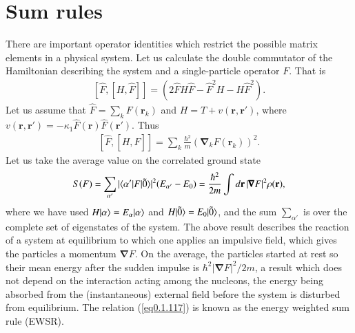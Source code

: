 \section{Sum rules}\label{Sect1.7}
There are important operator identities which restrict the possible matrix elements in a physical system. Let us calculate the double commutator of the Hamiltonian describing the system and a single-particle operator $F$. That is
\begin{align}\label{eq0.1.115}
\left[\hat F,\left[H,\hat F\right]\right]=\left(2\hat FH\hat F-\hat F^2H-H\hat F^2\right).
\end{align}
Let us assume that $\hat F=\sum_k F(\mathbf r_k)$ and $H=T+v(\mathbf r, \mathbf r')$, where $v(\mathbf r,\mathbf r')=-\kappa_1 \hat F(\mathbf r)\hat F(\mathbf r')$. Thus 
\begin{align}\label{eq0.1.116}
\left[\hat F,\left[H,\hat F\right]\right]=\sum_k\frac{\hbar^2}{m}\left(\pmb \nabla_kF(\mathbf r_k)\right)^2.
\end{align}
Let us take the average value on the correlated ground state
\begin{align}\label{eq0.1.117}
S(F)=\sum_{\alpha'}|\langle {\alpha'|F|\tilde 0} \rangle|^2(E_{\alpha'}-E_0)=\frac{\hbar^2}{2m}\int d\mathbf r\, |\pmb\nabla F|^2\rho(\mathbf r),
\end{align}
where we have used $H|{\alpha} \rangle=E_\alpha|{\alpha} \rangle$ and $H|{\tilde 0} \rangle=E_0|{\tilde 0} \rangle$, and the sum $\sum_{\alpha'}$ is over the complete set of eigenstates of the system. The above result describes the reaction of a system at equilibrium to which one applies an impulsive field, which gives the particles a momentum $\pmb \nabla F$. On the average, the particles started at rest so their mean energy after the sudden impulse is $\hbar^2|\pmb \nabla F|^2/2m$, a result which does not depend on the interaction acting among the nucleons, the energy being absorbed from the (instantaneous) external field before the system is disturbed from equilibrium. The relation (\ref{eq0.1.117}) is known as the energy weighted sum rule (EWSR). 


